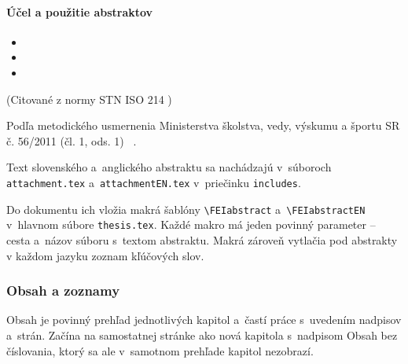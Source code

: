 \documentclass[../../../thesis.tex]{subfiles}
\begin{document}
\paragraph{Účel a použitie abstraktov}
\begin{itemize}\it
  \item {}

  \item {}

  \item {}
\end{itemize}
\begin{flushright}
(Citované z normy STN ISO 214 \cite{iso214})
\end{flushright}

Podľa metodického usmernenia Ministerstva školstva, vedy, výskumu a športu SR č. 56/2011 (čl. 1, ods. 1)
\emph{}~\cite{usmernenie562011}.

Text slovenského a~anglického abstraktu sa nachádzajú
v~súboroch \verb|attachment.tex| a~\verb|attachmentEN.tex| v~priečinku \verb|includes|.

Do dokumentu ich vložia makrá šablóny
\verb|\FEIabstract| a~\verb|\FEIabstractEN|
v~hlavnom súbore \verb|thesis.tex|.
Každé makro má jeden povinný parameter --
cesta a~názov súboru s~textom abstraktu.
Makrá zároveň vytlačia pod abstrakty
v každom jazyku zoznam kľúčových slov.

\subsubsection{Obsah a zoznamy}
Obsah je povinný prehľad jednotlivých kapitol
a~častí práce s~uvedením nadpisov a~strán.
Začína na samostatnej stránke ako nová kapitola
s~nadpisom Obsah bez číslovania,
ktorý sa ale v~samotnom prehľade kapitol nezobrazí.
\end{document}
